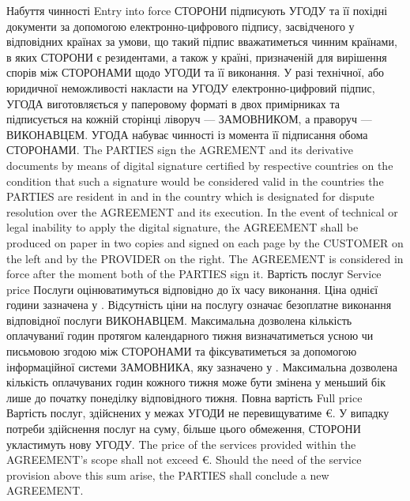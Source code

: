 \begin{Form}
\begin{paracol}{3}
        {}
      \clause
        {Набуття чинності}
        {Entry into force}
        {}
        {СТОРОНИ підписують УГОДУ та її похідні документи за допомогою електронно-цифрового підпису, засвідченого у відповідних країнах за умови, що такий підпис вважатиметься чинним країнами, в яких СТОРОНИ є резидентами, а також у країні, призначеній для вирішення спорів між СТОРОНАМИ щодо УГОДИ та її виконання. У разі технічної, або юридичної неможливості накласти на УГОДУ електронно-цифровий підпис, УГОДА виготовляється у паперовому форматі в двох примірниках та підписується на кожній сторінці ліворуч — ЗАМОВНИКОМ, а праворуч — ВИКОНАВЦЕМ. УГОДА набуває чинності із момента її підписання обома СТОРОНАМИ.}
        {The PARTIES sign the AGREMENT and its derivative documents by means of digital signature certified by respective countries on the condition that such a signature would be considered valid in the countries the PARTIES are resident in and in the country which is designated for dispute resolution over the AGREEMENT and its execution. In the event of technical or legal inability to apply the digital signature, the AGREEMENT shall be produced on paper in two copies and signed on each page by the CUSTOMER on the left and by the PROVIDER on the right. The AGREEMENT is considered in force after the moment both of the PARTIES sign it.}
        {}
      \clause
        {Вартість послуг}
        {Service price}
        {}
        {Послуги оцінюватимуться відповідно до їх часу виконання. Ціна однієї години зазначена у . Відсутність ціни на послугу означає безоплатне виконання відповідної послуги ВИКОНАВЦЕМ. Максимальна дозволена кількість оплачуваниї годин протягом календарного тижня визначатиметься усною чи письмовою згодою між СТОРОНАМИ та фіксуватиметься за допомогою інформаційної системи ЗАМОВНИКА, яку зазначено у . Максимальна дозволена кількість оплачуваних годин кожного тижня може бути змінена у меньший бік лише до початку понеділку відповідного тижня.}
        {}
        {}
      \clause
        {Повна вартість}
        {Full price}
        {}
        {Вартість послуг, здійснених у межах УГОДИ не перевищуватиме \raisebox{-2pt}{\TextField[name=fullpriceUK,borderwidth=0,width=75pt]{}} €. У випадку потреби здійснення послуг на суму, більше цього обмеження, СТОРОНИ укластимуть нову УГОДУ.}
        {The price of the services provided within the AGREEMENT's scope shall not exceed \raisebox{-2pt}{\TextField[name=fullpriceEN,borderwidth=0,width=75pt]{}} €. Should the need of the service provision above this sum arise, the PARTIES shall conclude a new AGREEMENT.}

\end{paracol}
\end{Form}
